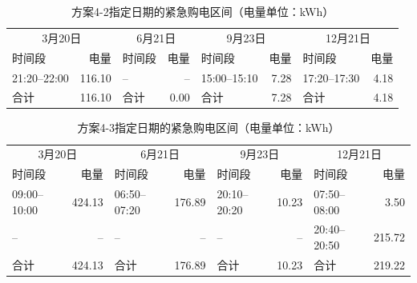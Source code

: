 \begin{table}[H]
\centering\footnotesize
\setlength{\tabcolsep}{5pt}
\caption{方案4-2指定日期的紧急购电区间（电量单位：kWh）}\label{tab:q4-emergency-4-2}
\begin{tabular}{lrlrlrlr}
\toprule
\multicolumn{2}{c}{3月20日} & \multicolumn{2}{c}{6月21日} & \multicolumn{2}{c}{9月23日} & \multicolumn{2}{c}{12月21日}\\
时间段 & 电量 & 时间段 & 电量 & 时间段 & 电量 & 时间段 & 电量\\
\midrule
21:20--22:00 & 116.10 & -- & -- & 15:00--15:10 & 7.28 & 17:20--17:30 & 4.18\\
合计 & 116.10 & 合计 & 0.00 & 合计 & 7.28 & 合计 & 4.18\\
\bottomrule
\end{tabular}
\end{table}
\begin{table}[H]
\centering\footnotesize
\setlength{\tabcolsep}{5pt}
\caption{方案4-3指定日期的紧急购电区间（电量单位：kWh）}\label{tab:q4-emergency-4-3}
\begin{tabular}{lrlrlrlr}
\toprule
\multicolumn{2}{c}{3月20日} & \multicolumn{2}{c}{6月21日} & \multicolumn{2}{c}{9月23日} & \multicolumn{2}{c}{12月21日}\\
时间段 & 电量 & 时间段 & 电量 & 时间段 & 电量 & 时间段 & 电量\\
\midrule
09:00--10:00 & 424.13 & 06:50--07:20 & 176.89 & 20:10--20:20 & 10.23 & 07:50--08:00 & 3.50\\
-- & -- & -- & -- & -- & -- & 20:40--20:50 & 215.72\\
合计 & 424.13 & 合计 & 176.89 & 合计 & 10.23 & 合计 & 219.22\\
\bottomrule
\end{tabular}
\end{table}

